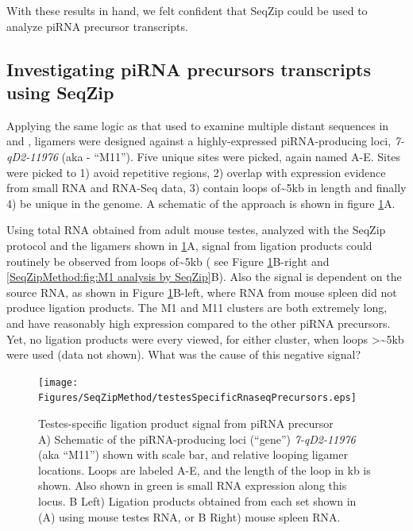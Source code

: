     With these results in hand, we felt confident that SeqZip could be used to analyze piRNA precursor transcripts.

  \subsection{Investigating piRNA precursors transcripts using SeqZip}
    \label{SeqZipMethod:sec:piRNA precursor by SeqZip}

    Applying the same logic as that used to examine multiple distant sequences in \dst{} and \fn{}, ligamers were designed against a highly-expressed piRNA-producing loci, \textit{7-qD2-11976} (aka - ``M11''). Five unique sites were picked, again named A-E. Sites were picked to 1) avoid repetitive regions, 2) overlap with expression evidence from small RNA and RNA-Seq data, 3) contain loops of\textasciitilde5kb in length and finally 4) be unique in the genome. A schematic of the approach is shown in figure \ref{SeqZipMethod:fig:Precursors are testes-specific}A.

    Using total RNA obtained from adult mouse testes, analyzed with the SeqZip protocol and the ligamers shown in \ref{SeqZipMethod:fig:Precursors are testes-specific}A, signal from ligation products could routinely be observed from loops of\textasciitilde5kb ( see Figure \ref{SeqZipMethod:fig:Precursors are testes-specific}B-right and \ref{SeqZipMethod:fig:M1 analysis by SeqZip}B). Also the signal is dependent on the source RNA, as shown in Figure \ref{SeqZipMethod:fig:Precursors are testes-specific}B-left, where RNA from mouse spleen did not produce ligation products. The M1 and M11 clusters are both extremely long, and have reasonably high expression compared to the other piRNA precursors. Yet, no ligation products were every viewed, for either cluster, when loops >\textasciitilde5kb were used (data not shown). What was the cause of this negative signal?

    \begin{figure} %
        \centering 
        \texttt{[image: Figures/SeqZipMethod/testesSpecificRnaseqPrecursors.eps]}
        \caption[Testes-specific ligation product signal from piRNA precursor]
        {
          Testes-specific ligation product signal from piRNA precursor\\[0.25cm]
          A) Schematic of the piRNA-producing loci (``gene'') \textit{7-qD2-11976} (aka ``M11'') shown with scale bar, and relative looping ligamer locations.  Loops are labeled A-E, and the length of the loop in kb is shown.  Also shown in green is small RNA expression along this locus. B Left) Ligation products obtained from each set shown in (A) using mouse testes RNA, or B Right) mouse spleen RNA.
        	}
        \label{SeqZipMethod:fig:Precursors are testes-specific}
      	\end{figure}

